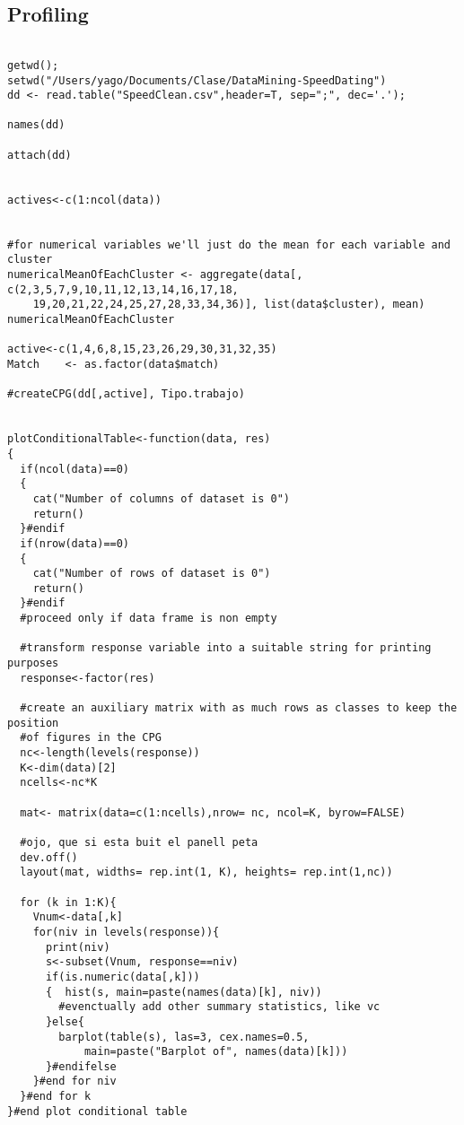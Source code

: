 \subsection{Profiling}

\begin{verbatim}

getwd();
setwd("/Users/yago/Documents/Clase/DataMining-SpeedDating")
dd <- read.table("SpeedClean.csv",header=T, sep=";", dec='.');

names(dd)

attach(dd)


actives<-c(1:ncol(data))


#for numerical variables we'll just do the mean for each variable and cluster
numericalMeanOfEachCluster <- aggregate(data[, c(2,3,5,7,9,10,11,12,13,14,16,17,18,
    19,20,21,22,24,25,27,28,33,34,36)], list(data$cluster), mean)
numericalMeanOfEachCluster

active<-c(1,4,6,8,15,23,26,29,30,31,32,35)
Match    <- as.factor(data$match)

#createCPG(dd[,active], Tipo.trabajo)


plotConditionalTable<-function(data, res)
{
  if(ncol(data)==0)
  {
    cat("Number of columns of dataset is 0")	
    return()
  }#endif
  if(nrow(data)==0) 
  {
    cat("Number of rows of dataset is 0")  
    return()
  }#endif
  #proceed only if data frame is non empty
  
  #transform response variable into a suitable string for printing purposes
  response<-factor(res)
  
  #create an auxiliary matrix with as much rows as classes to keep the position 
  #of figures in the CPG
  nc<-length(levels(response))
  K<-dim(data)[2]
  ncells<-nc*K
  
  mat<- matrix(data=c(1:ncells),nrow= nc, ncol=K, byrow=FALSE)
  
  #ojo, que si esta buit el panell peta
  dev.off()
  layout(mat, widths= rep.int(1, K), heights= rep.int(1,nc))
  
  for (k in 1:K){
    Vnum<-data[,k]
    for(niv in levels(response)){
      print(niv)
      s<-subset(Vnum, response==niv)
      if(is.numeric(data[,k]))
      {  hist(s, main=paste(names(data)[k], niv))
        #evenctually add other summary statistics, like vc
      }else{
        barplot(table(s), las=3, cex.names=0.5,
            main=paste("Barplot of", names(data)[k]))
      }#endifelse
    }#end for niv       
  }#end for k
}#end plot conditional table      



\end{verbatim}
